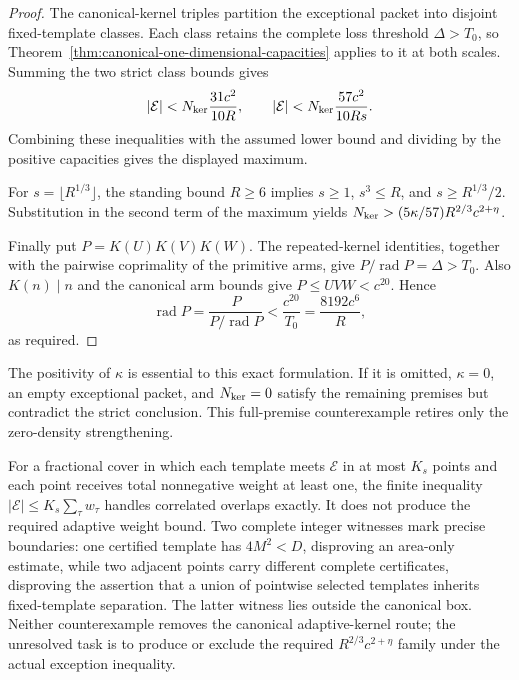\begin{proof}
The canonical-kernel triples partition the exceptional packet into disjoint
fixed-template classes.  Each class retains the complete loss threshold
$\Delta>T_0$, so Theorem~\ref{thm:canonical-one-dimensional-capacities}
applies to it at both scales.  Summing the two strict class bounds gives
\[
 |\mathcal E|<N_{\rm ker}\frac{31c^2}{10R},
 \qquad
 |\mathcal E|<N_{\rm ker}\frac{57c^2}{10Rs}.
\]
Combining these inequalities with the assumed lower bound and dividing by
the positive capacities gives the displayed maximum.

For $s=\lfloor R^{1/3}\rfloor$, the standing bound $R\ge6$ implies
$s\ge1$, $s^3\le R$, and $s\ge R^{1/3}/2$.  Substitution in the second
term of the maximum yields
$N_{\rm ker}>(5\kappa/57)R^{2/3}c^{2+\eta}$.

Finally put $P=K(U)K(V)K(W)$.  The repeated-kernel identities, together
with the pairwise coprimality of the primitive arms, give
$P/\operatorname{rad}P=\Delta>T_0$.  Also $K(n)\mid n$ and the canonical
arm bounds give $P\le UVW<c^{20}$.  Hence
\[
 \operatorname{rad}P=\frac{P}{P/\operatorname{rad}P}
 <\frac{c^{20}}{T_0}=\frac{8192c^6}{R},
\]
as required.
\end{proof}

The positivity of $\kappa$ is essential to this exact formulation.  If it is
omitted, $\kappa=0$, an empty exceptional packet, and $N_{\rm ker}=0$ satisfy
the remaining premises but contradict the strict conclusion.  This
full-premise counterexample retires only the zero-density strengthening.

For a fractional cover in which each template meets $\mathcal E$ in at most
$K_s$ points and each point receives total nonnegative weight at least one,
the finite inequality $|\mathcal E|\le K_s\sum_\tau w_\tau$ handles
correlated overlaps exactly.
It does not produce the required adaptive weight bound.  Two complete
integer witnesses mark precise boundaries: one certified template has
$4M^2<D$, disproving an area-only estimate, while two adjacent points carry
different complete certificates, disproving the assertion that a union of
pointwise selected templates inherits fixed-template separation.  The latter
witness lies outside the canonical box.  Neither counterexample removes the
canonical adaptive-kernel route; the unresolved task is to produce or exclude
the required $R^{2/3}c^{2+\eta}$ family under the actual exception inequality.
